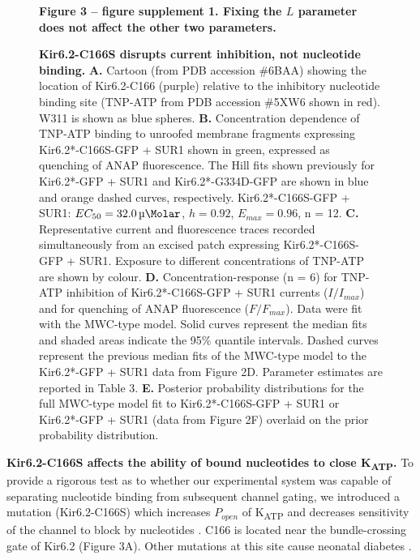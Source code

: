 \documentclass[10pt,lineno, doublespacing]{elife_modified}
\begin{document}
\begin{figure}\ContinuedFloat
\begin{fullwidth}
\caption{
\textbf{Kir6.2-C166S disrupts current inhibition, not nucleotide binding.}
\textbf{A.}
Cartoon (from PDB accession \#6BAA) showing the location of Kir6.2-C166 (purple) relative to the inhibitory nucleotide binding site (TNP-ATP from PDB accession \#5XW6 shown in red).
W311 is shown as blue spheres.
\textbf{B.}
Concentration dependence of TNP-ATP binding to unroofed membrane fragments expressing Kir6.2*-C166S-GFP + SUR1 shown in green, expressed as quenching of ANAP fluorescence.
The Hill fits shown previously for Kir6.2*-GFP + SUR1 and Kir6.2*-G334D-GFP are shown in blue and orange dashed curves, respectively.
Kir6.2*-C166S-GFP + SUR1: $EC_{50} = \SI{32.0}{\micro\Molar}$, $h = 0.92$, $E_{max} = 0.96$, n = 12.
\textbf{C.}
Representative current and fluorescence traces recorded simultaneously from an excised patch expressing Kir6.2*-C166S-GFP + SUR1.
Exposure to different concentrations of TNP-ATP are shown by colour.
\textbf{D.}
Concentration-response (n = 6) for TNP-ATP inhibition of Kir6.2*-C166S-GFP + SUR1 currents ($I/I_{max}$) and for quenching of ANAP fluorescence ($F/F_{max}$).
Data were fit with the MWC-type model.
Solid curves represent the median fits and shaded areas indicate the 95\% quantile intervals.
Dashed curves represent the previous median fits of the MWC-type model to the Kir6.2*-GFP + SUR1 data from Figure 2D.
Parameter estimates are reported in Table 3.
\textbf{E.} Posterior probability distributions for the full MWC-type model fit to Kir6.2*-C166S-GFP + SUR1 or Kir6.2*-GFP + SUR1 (data from Figure 2F) overlaid on the prior probability distribution.
}
\raggedright
\textbf{\small Figure 3 -- figure supplement 1. Fixing the $L$ parameter does not affect the other two parameters.}
\end{fullwidth}
\end{figure}

\textbf{Kir6.2-C166S affects the ability of bound nucleotides to close K\textsubscript{ATP}.}
To provide a rigorous test as to whether our experimental system was capable of separating nucleotide binding from subsequent channel gating, we introduced a mutation (Kir6.2-C166S) which increases $P_{open}$ of K\textsubscript{ATP} and decreases sensitivity of the channel to block by nucleotides \citep{RN92}.
C166 is located near the bundle-crossing gate of Kir6.2 (Figure 3A).
Other mutations at this site cause neonatal diabetes \citep{RN93, RN94}.
\end{document}
